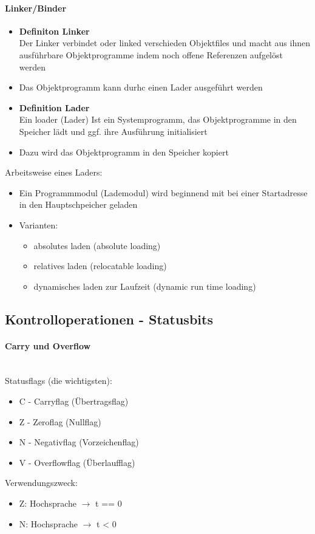 		\paragraph{Linker/Binder}
		\begin{itemize}
			\item \textbf{Definiton Linker} \\
				Der Linker verbindet oder linked verschieden Objektfiles und macht aus ihnen
				ausführbare Objektprogramme indem noch offene Referenzen aufgelöst werden
			\item Das Objektprogramm kann durhc einen Lader ausgeführt werden
			\item \textbf{Definition Lader} \\
				Ein loader (Lader) Ist ein Systemprogramm, das Objektprogramme in den
				Speicher lädt und ggf. ihre Ausführung initialisiert
			\item Dazu wird das Objektprogramm in den Speicher kopiert \\
		\end{itemize}

		\noindent Arbeitsweise eines Laders:
		\begin{itemize}
			\item Ein Programmmodul (Lademodul) wird beginnend mit bei einer Startadresse
				in den Hauptschpeicher geladen
			\item Varianten:
					\begin{itemize}
						\item absolutes laden (absolute loading)
						\item relatives laden (relocatable loading)
						\item dynamisches laden zur Laufzeit (dynamic run time loading)
					\end{itemize}
		\end{itemize}


	

	\subsection{Kontrolloperationen - Statusbits}
		\paragraph{Carry und Overflow} \mbox{} \\
		Statusflags (die wichtigsten):
		\begin{itemize}
			\item C - Carryflag (Übertragsflag)
			\item Z - Zeroflag (Nullflag)
			\item N - Negativflag (Vorzeichenflag)
			\item V - Overflowflag (Überlaufflag)
		\end{itemize}
		Verwendungszweck:
		\begin{itemize}
			\item Z: Hochsprache $\rightarrow$ t == 0
			\item N: Hochsprache $\rightarrow$ t < 0
		\end{itemize}
		\vspace{0.5cm}

